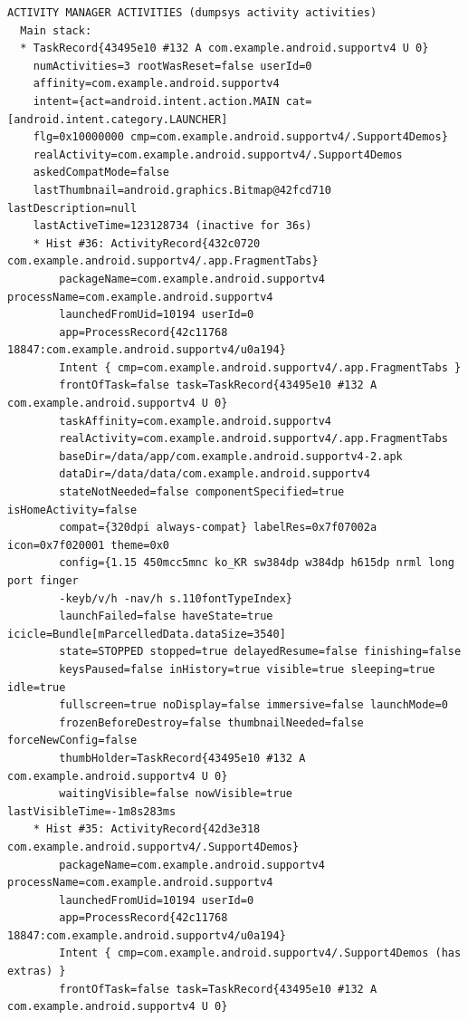 \begin{lstlisting}[frame=single]
ACTIVITY MANAGER ACTIVITIES (dumpsys activity activities)
  Main stack:
  * TaskRecord{43495e10 #132 A com.example.android.supportv4 U 0}
    numActivities=3 rootWasReset=false userId=0
    affinity=com.example.android.supportv4
    intent={act=android.intent.action.MAIN cat=[android.intent.category.LAUNCHER] 
    flg=0x10000000 cmp=com.example.android.supportv4/.Support4Demos}
    realActivity=com.example.android.supportv4/.Support4Demos
    askedCompatMode=false
    lastThumbnail=android.graphics.Bitmap@42fcd710 lastDescription=null
    lastActiveTime=123128734 (inactive for 36s)
    * Hist #36: ActivityRecord{432c0720 com.example.android.supportv4/.app.FragmentTabs}
        packageName=com.example.android.supportv4 processName=com.example.android.supportv4
        launchedFromUid=10194 userId=0
        app=ProcessRecord{42c11768 18847:com.example.android.supportv4/u0a194}
        Intent { cmp=com.example.android.supportv4/.app.FragmentTabs }
        frontOfTask=false task=TaskRecord{43495e10 #132 A com.example.android.supportv4 U 0}
        taskAffinity=com.example.android.supportv4
        realActivity=com.example.android.supportv4/.app.FragmentTabs
        baseDir=/data/app/com.example.android.supportv4-2.apk
        dataDir=/data/data/com.example.android.supportv4
        stateNotNeeded=false componentSpecified=true isHomeActivity=false
        compat={320dpi always-compat} labelRes=0x7f07002a icon=0x7f020001 theme=0x0
        config={1.15 450mcc5mnc ko_KR sw384dp w384dp h615dp nrml long port finger 
        -keyb/v/h -nav/h s.110fontTypeIndex}
        launchFailed=false haveState=true icicle=Bundle[mParcelledData.dataSize=3540]
        state=STOPPED stopped=true delayedResume=false finishing=false
        keysPaused=false inHistory=true visible=true sleeping=true idle=true
        fullscreen=true noDisplay=false immersive=false launchMode=0
        frozenBeforeDestroy=false thumbnailNeeded=false forceNewConfig=false
        thumbHolder=TaskRecord{43495e10 #132 A com.example.android.supportv4 U 0}
        waitingVisible=false nowVisible=true lastVisibleTime=-1m8s283ms
    * Hist #35: ActivityRecord{42d3e318 com.example.android.supportv4/.Support4Demos}
        packageName=com.example.android.supportv4 processName=com.example.android.supportv4
        launchedFromUid=10194 userId=0
        app=ProcessRecord{42c11768 18847:com.example.android.supportv4/u0a194}
        Intent { cmp=com.example.android.supportv4/.Support4Demos (has extras) }
        frontOfTask=false task=TaskRecord{43495e10 #132 A com.example.android.supportv4 U 0}

\end{lstlisting}
